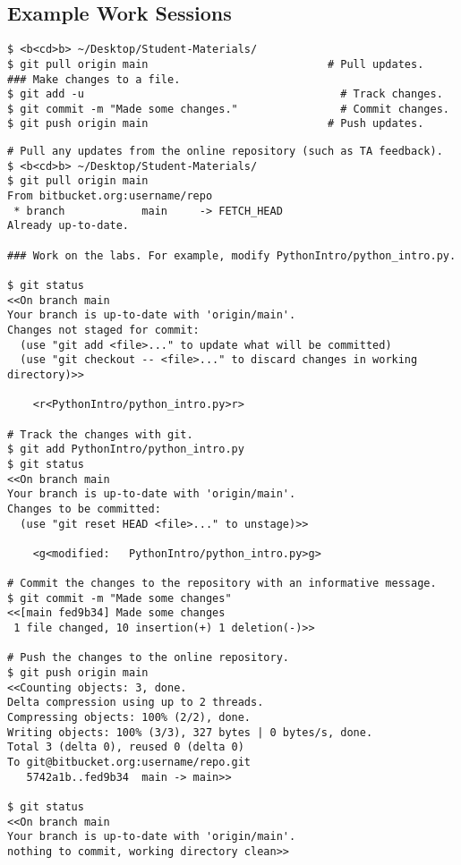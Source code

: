 
\subsection*{Example Work Sessions}

\begin{lstlisting}
$ <b<cd>b> ~/Desktop/Student-Materials/
$ git pull origin main                            # Pull updates.
### Make changes to a file.
$ git add -u                                        # Track changes.
$ git commit -m "Made some changes."                # Commit changes.
$ git push origin main                            # Push updates.
\end{lstlisting}

\begin{lstlisting}
# Pull any updates from the online repository (such as TA feedback).
$ <b<cd>b> ~/Desktop/Student-Materials/
$ git pull origin main
From bitbucket.org:username/repo
 * branch            main     -> FETCH_HEAD
Already up-to-date.

### Work on the labs. For example, modify PythonIntro/python_intro.py.

$ git status
<<On branch main
Your branch is up-to-date with 'origin/main'.
Changes not staged for commit:
  (use "git add <file>..." to update what will be committed)
  (use "git checkout -- <file>..." to discard changes in working directory)>>

    <r<PythonIntro/python_intro.py>r>

# Track the changes with git.
$ git add PythonIntro/python_intro.py
$ git status
<<On branch main
Your branch is up-to-date with 'origin/main'.
Changes to be committed:
  (use "git reset HEAD <file>..." to unstage)>>

    <g<modified:   PythonIntro/python_intro.py>g>

# Commit the changes to the repository with an informative message.
$ git commit -m "Made some changes"
<<[main fed9b34] Made some changes
 1 file changed, 10 insertion(+) 1 deletion(-)>>

# Push the changes to the online repository.
$ git push origin main
<<Counting objects: 3, done.
Delta compression using up to 2 threads.
Compressing objects: 100% (2/2), done.
Writing objects: 100% (3/3), 327 bytes | 0 bytes/s, done.
Total 3 (delta 0), reused 0 (delta 0)
To git@bitbucket.org:username/repo.git
   5742a1b..fed9b34  main -> main>>

$ git status
<<On branch main
Your branch is up-to-date with 'origin/main'.
nothing to commit, working directory clean>>
\end{lstlisting}
